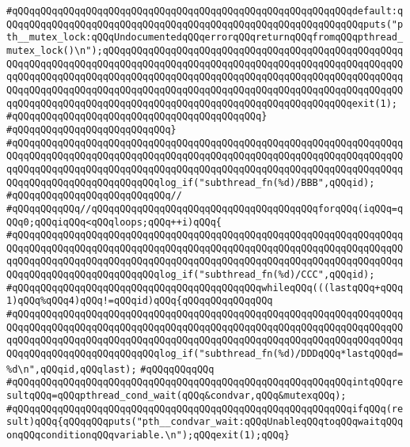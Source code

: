 \verb|#qQQqqQQqqQQqqQQqqQQqqQQqqQQqqQQqqQQqqQQqqQQqqQQqqQQqqQQqqQQqdefault:qQQqqQQqqQQqqQQqqQQqqQQqqQQqqQQqqQQqqQQqqQQqqQQqqQQqqQQqqQQqqQQqputs("pth__mutex_lock:qQQqUndocumentedqQQqerrorqQQqreturnqQQqfromqQQqpthread_mutex_lock()\n");qQQqqQQqqQQqqQQqqQQqqQQqqQQqqQQqqQQqqQQqqQQqqQQqqQQqqQQqqQQqqQQqqQQqqQQqqQQqqQQqqQQqqQQqqQQqqQQqqQQqqQQqqQQqqQQqqQQqqQQqqQQqqQQqqQQqqQQqqQQqqQQqqQQqqQQqqQQqqQQqqQQqqQQqqQQqqQQqqQQqqQQqqQQqqQQqqQQqqQQqqQQqqQQqqQQqqQQqqQQqqQQqqQQqqQQqqQQqqQQqqQQqqQQqqQQqqQQqqQQqqQQqqQQqqQQqqQQqqQQqqQQqqQQqqQQqqQQqqQQqqQQqqQQqqQQqqQQqqQQqqQQqexit(1);|\newline
\verb|#qQQqqQQqqQQqqQQqqQQqqQQqqQQqqQQqqQQqqQQqqQQq}|\newline
\verb|#qQQqqQQqqQQqqQQqqQQqqQQqqQQq}|\newline
\verb|#qQQqqQQqqQQqqQQqqQQqqQQqqQQqqQQqqQQqqQQqqQQqqQQqqQQqqQQqqQQqqQQqqQQqqQQqqQQqqQQqqQQqqQQqqQQqqQQqqQQqqQQqqQQqqQQqqQQqqQQqqQQqqQQqqQQqqQQqqQQqqQQqqQQqqQQqqQQqqQQqqQQqqQQqqQQqqQQqqQQqqQQqqQQqqQQqqQQqqQQqqQQqqQQqqQQqqQQqqQQqqQQqqQQqqQQqqQQqlog_if("subthread_fn(%d)/BBB",qQQqid);|\newline
\verb|#qQQqqQQqqQQqqQQqqQQqqQQqqQQq//|\newline
\verb|#qQQqqQQqqQQq//qQQqqQQqqQQqqQQqqQQqqQQqqQQqqQQqqQQqqQQqforqQQq(iqQQq=qQQq0;qQQqiqQQq<qQQqloops;qQQq++i)qQQq{|\newline
\verb|#qQQqqQQqqQQqqQQqqQQqqQQqqQQqqQQqqQQqqQQqqQQqqQQqqQQqqQQqqQQqqQQqqQQqqQQqqQQqqQQqqQQqqQQqqQQqqQQqqQQqqQQqqQQqqQQqqQQqqQQqqQQqqQQqqQQqqQQqqQQqqQQqqQQqqQQqqQQqqQQqqQQqqQQqqQQqqQQqqQQqqQQqqQQqqQQqqQQqqQQqqQQqqQQqqQQqqQQqqQQqqQQqqQQqqQQqqQQqlog_if("subthread_fn(%d)/CCC",qQQqid);|\newline
\verb|#qQQqqQQqqQQqqQQqqQQqqQQqqQQqqQQqqQQqqQQqqQQqwhileqQQq(((lastqQQq+qQQq1)qQQq%qQQq4)qQQq!=qQQqid)qQQq{qQQqqQQqqQQqqQQq|\newline
\verb|#qQQqqQQqqQQqqQQqqQQqqQQqqQQqqQQqqQQqqQQqqQQqqQQqqQQqqQQqqQQqqQQqqQQqqQQqqQQqqQQqqQQqqQQqqQQqqQQqqQQqqQQqqQQqqQQqqQQqqQQqqQQqqQQqqQQqqQQqqQQqqQQqqQQqqQQqqQQqqQQqqQQqqQQqqQQqqQQqqQQqqQQqqQQqqQQqqQQqqQQqqQQqqQQqqQQqqQQqqQQqqQQqqQQqqQQqqQQqlog_if("subthread_fn(%d)/DDDqQQq*lastqQQqd=%d\n",qQQqid,qQQqlast);|\newline
\verb|#qQQqqQQqqQQq|\newline
\verb|#qQQqqQQqqQQqqQQqqQQqqQQqqQQqqQQqqQQqqQQqqQQqqQQqqQQqqQQqqQQqintqQQqresultqQQq=qQQqpthread_cond_wait(qQQq&condvar,qQQq&mutexqQQq);|\newline
\verb|#qQQqqQQqqQQqqQQqqQQqqQQqqQQqqQQqqQQqqQQqqQQqqQQqqQQqqQQqqQQqifqQQq(result)qQQq{qQQqqQQqputs("pth__condvar_wait:qQQqUnableqQQqtoqQQqwaitqQQqonqQQqconditionqQQqvariable.\n");qQQqexit(1);qQQq}|\newline
